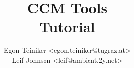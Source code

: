 \documentclass{report}
\title{{\Huge CCM Tools}\\Tutorial}
\author{Egon Teiniker <egon.teiniker@tugraz.at>\\
Leif Johnson <leif@ambient.2y.net>}
\begin{document}
\maketitle
{}
\tableofcontents
\listoffigures

\newpage
{}
\setlength{\parskip}{1em}





%
%
%


\begin{appendix}


%
\end{appendix}



\end{document}
